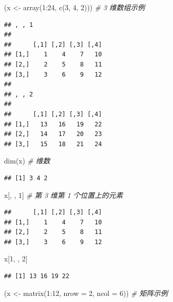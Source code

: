 \documentclass[
  b5paper,
  UTF8,twoside]{book}
\newenvironment{Shaded}{\begin{snugshade}}{\end{snugshade}}
\newcommand{\AttributeTok}[1]{\textcolor[rgb]{0.77,0.63,0.00}{#1}}
\newcommand{\CommentTok}[1]{\textcolor[rgb]{0.56,0.35,0.01}{\textit{#1}}}
\newcommand{\DecValTok}[1]{\textcolor[rgb]{0.00,0.00,0.81}{#1}}
\newcommand{\FunctionTok}[1]{\textcolor[rgb]{0.00,0.00,0.00}{#1}}
\newcommand{\NormalTok}[1]{#1}
\newcommand{\OtherTok}[1]{\textcolor[rgb]{0.56,0.35,0.01}{#1}}
\newcommand{\SpecialCharTok}[1]{\textcolor[rgb]{0.00,0.00,0.00}{#1}}
\begin{document}
\begin{Shaded}
\begin{Highlighting}[]
\NormalTok{(x }\OtherTok{\textless{}{-}} \FunctionTok{array}\NormalTok{(}\DecValTok{1}\SpecialCharTok{:}\DecValTok{24}\NormalTok{, }\FunctionTok{c}\NormalTok{(}\DecValTok{3}\NormalTok{, }\DecValTok{4}\NormalTok{, }\DecValTok{2}\NormalTok{))) }\CommentTok{\# 3 维数组示例}
\end{Highlighting}
\end{Shaded}

\begin{verbatim}
## , , 1
## 
##      [,1] [,2] [,3] [,4]
## [1,]    1    4    7   10
## [2,]    2    5    8   11
## [3,]    3    6    9   12
## 
## , , 2
## 
##      [,1] [,2] [,3] [,4]
## [1,]   13   16   19   22
## [2,]   14   17   20   23
## [3,]   15   18   21   24
\end{verbatim}

\begin{Shaded}
\begin{Highlighting}[]
\FunctionTok{dim}\NormalTok{(x) }\CommentTok{\# 维数}
\end{Highlighting}
\end{Shaded}

\begin{verbatim}
## [1] 3 4 2
\end{verbatim}

\begin{Shaded}
\begin{Highlighting}[]
\NormalTok{x[, , }\DecValTok{1}\NormalTok{] }\CommentTok{\# 第 3 维第 1 个位置上的元素}
\end{Highlighting}
\end{Shaded}

\begin{verbatim}
##      [,1] [,2] [,3] [,4]
## [1,]    1    4    7   10
## [2,]    2    5    8   11
## [3,]    3    6    9   12
\end{verbatim}

\begin{Shaded}
\begin{Highlighting}[]
\NormalTok{x[}\DecValTok{1}\NormalTok{, , }\DecValTok{2}\NormalTok{]}
\end{Highlighting}
\end{Shaded}

\begin{verbatim}
## [1] 13 16 19 22
\end{verbatim}

\begin{Shaded}
\begin{Highlighting}[]
\NormalTok{(x }\OtherTok{\textless{}{-}} \FunctionTok{matrix}\NormalTok{(}\DecValTok{1}\SpecialCharTok{:}\DecValTok{12}\NormalTok{, }\AttributeTok{nrow =} \DecValTok{2}\NormalTok{, }\AttributeTok{ncol =} \DecValTok{6}\NormalTok{)) }\CommentTok{\# 矩阵示例}
\end{Highlighting}
\end{Shaded}
\end{document}
